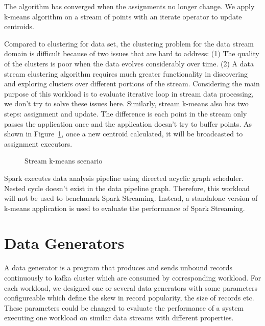 The algorithm has converged when the assignments no longer change. We apply k-means algorithm on a stream of points with an iterate operator to update centroids.

Compared to clustering for data set, the clustering problem for the data stream domain is difficult because of two issues that are hard to address: (1) The quality of the clusters is poor when the data evolves considerably over time. (2) A data stream clustering algorithm requires much greater functionality in discovering and exploring clusters over different portions of the stream.\cite{aggarwal2003framework} Considering the main purpose of this workload is to evaluate iterative loop in stream data processing, we don't try to solve these issues here. Similarly, stream k-means also has two steps: assignment and update. The difference is each point in the stream only passes the application once and the application doesn't try to buffer points. As shown in Figure~\ref{fig:iterator_operator}, once a new centroid calculated, it will be broadcasted to assignment executors. 

 \begin{figure}
  \begin{center}
   \caption{Stream k-means scenario}
   \label{fig:iterator_operator}
  \end{center}
\end{figure}

Spark executes data analysis pipeline using directed acyclic graph scheduler.  Nested cycle doesn't exist in the data pipeline graph. Therefore, this workload will not be used to benchmark Spark Streaming. Instead, a standalone version of k-means application is used to evaluate the performance of Spark Streaming.

\section{Data Generators}
\label{section:data_generator}
 A data generator is a program that produces and sends unbound records continuously to kafka cluster which are consumed by corresponding workload. For each workload, we designed one or several data generators with some parameters configureable which define the skew in record popularity, the size of records etc. These parameters could be changed to evaluate the performance of a system executing one workload on similar data streams with different properties. 


